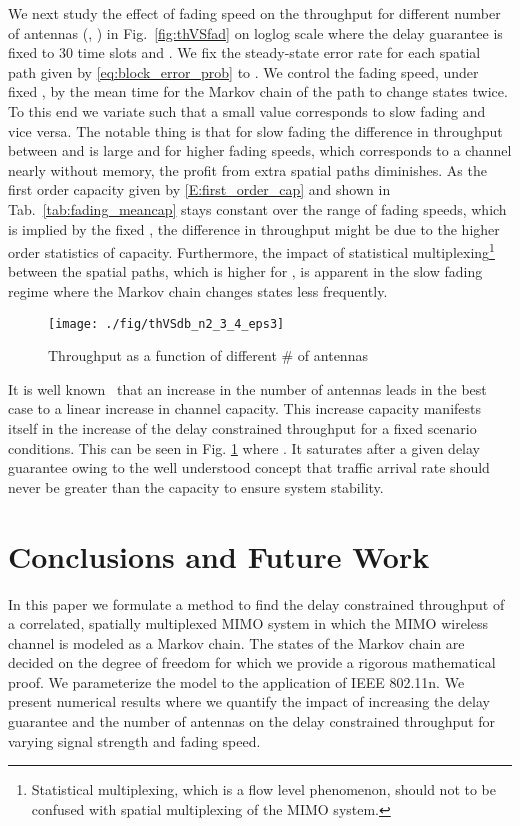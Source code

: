 \documentclass[10pt,conference]{IEEEtran}
\begin{document}
We next study the effect of fading speed on the throughput for different number of antennas (, ) in Fig.~\ref{fig:thVSfad} on loglog scale where the delay guarantee is fixed to 30 time slots and .
We fix the steady-state error rate  for each spatial path given by \eqref{eq:block_error_prob} to . We control the fading speed, under fixed , by the mean time for the Markov chain of the path to change states twice.
To this end we variate  such that a small value corresponds to slow fading and vice versa.
The notable thing is that for slow fading the difference in throughput between  and  is large and for higher fading speeds, which corresponds to a channel nearly without memory, the profit from extra spatial paths diminishes.
As the first order capacity  given by \eqref{E:first_order_cap} and shown in Tab.~\ref{tab:fading_meancap} stays constant over the range of fading speeds, which is implied by the fixed , the difference in throughput might be due to the higher order statistics of capacity.
Furthermore, the impact of statistical multiplexing\footnote{Statistical multiplexing, which is a flow level phenomenon, should not to be confused with spatial multiplexing of the MIMO system.} between the spatial paths, which is higher for , is apparent in the slow fading regime where the Markov chain changes states less frequently.
\begin{figure}[t]
	\centering
		 \texttt{[image: ./fig/thVSdb\_n2\_3\_4\_eps3]}
	\caption{Throughput as a function of different \# of antennas }
	\label{fig:thVSdb_diff_nr_antennas}
\end{figure}


It is well known~\cite{MIMO:Teletar99:CapacityOfMultiAntennaGaus} that an increase in the number of antennas leads in the best case to a linear increase in channel capacity.
This increase capacity manifests itself in the increase of the delay constrained throughput for a fixed scenario conditions.
This can be seen in Fig. \ref{fig:thVSdb_diff_nr_antennas} where .
It saturates after a given delay guarantee owing to the well understood concept that traffic arrival rate should never be greater than the capacity to ensure system stability.
\section{Conclusions and Future Work}
In this paper we formulate a method to find the delay constrained throughput of a correlated, spatially multiplexed MIMO system in which the MIMO wireless channel is modeled as a Markov chain.
The states of the Markov chain are decided on the degree of freedom for which we provide a rigorous mathematical proof.
We parameterize the model to the application of IEEE 802.11n.
We present numerical results where we quantify the impact of increasing the delay guarantee and the number of antennas on the delay constrained throughput for varying signal strength and fading speed.
\end{document}
